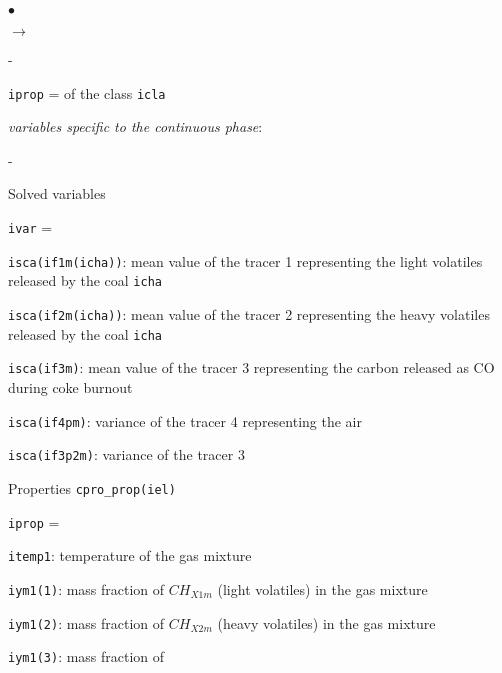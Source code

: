 {{{\begin{list}{$\bullet$}{}
\begin{list}{$\rightarrow$}{}
\begin{list}{}{}
\begin{list}{-}{}
\begin{list}{\texttt{iprop} = }{}
                            of the class \texttt{icla}
                     \end{list}
              \end{list}
              \item {\em variables specific to the continuous phase}:
              \begin{list}{-}{}
               \item Solved variables
                     \begin{list}{\texttt{ivar} = }{}
                      \item \texttt{isca(if1m(icha))}: mean value of
                            the tracer 1 representing the light
                            volatiles released by the coal \texttt{icha}
                      \item \texttt{isca(if2m(icha))}: mean value of
                            the tracer 2 representing the heavy
                            volatiles released by the coal \texttt{icha}
                      \item \texttt{isca(if3m)}: mean value of the
                            tracer 3 representing the carbon released as
                            CO during coke burnout
                      \item \texttt{isca(if4pm)}: variance of the
                            tracer 4 representing the air
                      \item \texttt{isca(if3p2m)}: variance of the
                            tracer 3
                     \end{list}
               \item Properties \texttt{cpro\_prop(iel)}
                     \begin{list}{\texttt{iprop} = }{}
                      \item \texttt{itemp1}: temperature of the
                            gas mixture
                      \item \texttt{iym1(1)}: mass fraction of
                            $CH_{X1m}$ (light volatiles) in the gas
                            mixture
                      \item \texttt{iym1(2)}: mass fraction of
                            $CH_{X2m}$ (heavy volatiles) in the gas
                            mixture
                      \item \texttt{iym1(3)}: mass fraction of

\end{list}
\end{list}
\end{list}
\end{list}
\end{list}}}}
